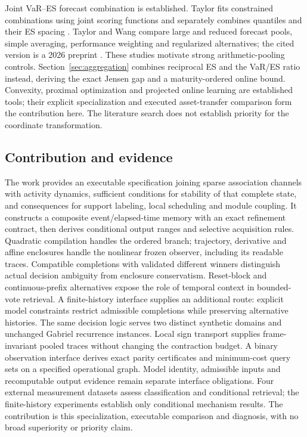 \documentclass[11pt,a4paper]{article}
\theoremstyle{definition}\newtheorem{definition}[theorem]{Definition}
\begin{document}
Joint VaR--ES forecast combination is established. Taylor fits constrained combinations using joint scoring functions and separately combines quantiles and their ES spacing \cite{taylor2020combinations}. Taylor and Wang compare large and reduced forecast pools, simple averaging, performance weighting and regularized alternatives; the cited version is a 2026 preprint \cite{taylor2026largepool}. These studies motivate strong arithmetic-pooling controls. Section~\ref{sec:aggregation} combines reciprocal ES and the VaR/ES ratio instead, deriving the exact Jensen gap and a maturity-ordered online bound. Convexity, proximal optimization and projected online learning are established tools; their explicit specialization and executed asset-transfer comparison form the contribution here. The literature search does not establish priority for the coordinate transformation.

\subsection{Contribution and evidence}
The work provides an executable specification joining sparse association channels with activity dynamics, sufficient conditions for stability of that complete state, and consequences for support labeling, local scheduling and module coupling. It constructs a composite event/elapsed-time memory with an exact refinement contract, then derives conditional output ranges and selective acquisition rules. Quadratic compilation handles the ordered branch; trajectory, derivative and affine enclosures handle the nonlinear frozen observer, including its readable traces. Compatible completions with validated different winners distinguish actual decision ambiguity from enclosure conservatism. Reset-block and continuous-prefix alternatives expose the role of temporal context in bounded-vote retrieval. A finite-history interface supplies an additional route: explicit model constraints restrict admissible completions while preserving alternative histories. The same decision logic serves two distinct synthetic domains and unchanged Gabriel recurrence instances. Local sign transport supplies frame-invariant pooled traces without changing the contraction budget. A binary observation interface derives exact parity certificates and minimum-cost query sets on a specified operational graph. Model identity, admissible inputs and recomputable output evidence remain separate interface obligations. Four external measurement datasets assess classification and conditional retrieval; the finite-history experiments establish only conditional mechanism results. The contribution is this specialization, executable comparison and diagnosis, with no broad superiority or priority claim.
\end{document}
